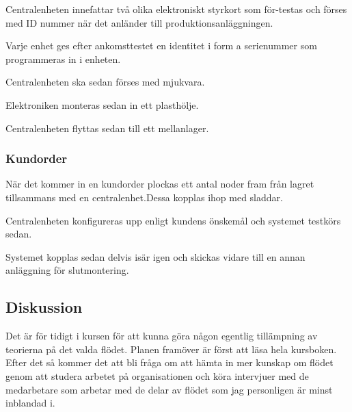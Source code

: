 \documentclass{article}
\begin{document}
Centralenheten innefattar två olika elektroniskt styrkort som för-testas och förses med ID nummer när det anländer till produktionsanläggningen. 

Varje enhet ges efter ankomsttestet en identitet i form a serienummer som programmeras in i enheten.

Centralenheten ska sedan förses med mjukvara.

Elektroniken monteras sedan in ett plasthölje.

Centralenheten flyttas sedan till ett mellanlager.

\subsubsection*{Kundorder}
När det kommer in en kundorder plockas ett antal noder fram från lagret tillsammans med en centralenhet.Dessa kopplas ihop med sladdar.

Centralenheten konfigureras upp enligt kundens önskemål och systemet testkörs sedan. 

Systemet kopplas sedan delvis isär igen och skickas vidare till en annan anläggning för slutmontering.

\subsection*{Diskussion}
Det är för tidigt i kursen för att kunna göra någon egentlig tillämpning av teorierna på det valda flödet. Planen framöver är först att läsa hela kursboken. Efter det så kommer det att bli fråga om att hämta in mer kunskap om flödet genom att studera arbetet på organisationen och köra intervjuer med de medarbetare som arbetar med de delar av flödet som jag personligen är minst inblandad i.
\end{document}
